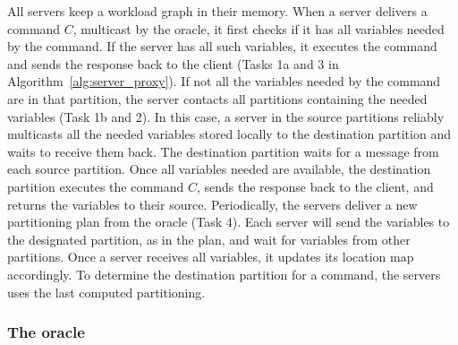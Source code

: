 All servers keep a workload graph in their memory. When a server delivers a command $C$, multicast by the oracle, it first checks if it has all variables needed by the command. If the server has all such variables, it executes the command and sends the response back to the client (Tasks 1a and 3 in Algorithm~\ref{alg:server_proxy}).
If not all the variables needed by the command are in that partition, the server contacts all partitions containing the needed variables (Task 1b and 2).
In this case, a server in the source partitions reliably multicasts all the needed variables stored locally to the destination partition and waits to receive them back.
The destination partition waits for a message from each source partition. Once all variables needed are available, the destination partition executes the command $C$, sends the response back to the client, and returns the variables to their source.
Periodically, the servers deliver a new partitioning plan from the oracle (Task 4). Each server will send the variables to the designated partition, as in the plan, and wait for variables from other partitions. Once a server receives all variables, it updates its location map accordingly.
To determine the destination partition for a command, the servers uses the last computed partitioning.

\subsubsection{The oracle} 


